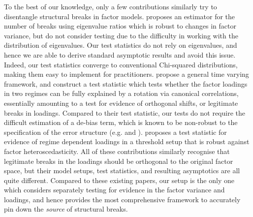 \documentclass[12pt]{article}
\theoremstyle{plain}
\numberwithin{equation}{section}
\begin{document}
To the best of our knowledge, only a few contributions similarly try to disentangle structural breaks in factor models.  \textcite{wang_identification_2021} proposes an estimator for the number of breaks using eigenvalue ratios which is robust to changes in factor variance, but do not consider testing due to the difficulty in working with the distribution of eigenvalues. Our test statistics do not rely on eigenvalues, and hence we are able to derive standard asymptotic results and avoid this issue. Indeed, our test statistics converge to conventional Chi-squared distributions, making them easy to implement for practitioners. \textcite{pelger_state-varying_2022} propose a general time varying framework, and construct a test statistic which tests whether the factor loadings in two regimes can be fully explained by a rotation via canonical correlations, essentially amounting to a test for evidence of orthogonal shifts, or legitimate breaks in loadings. Compared to their test statistic, our tests do not require the difficult estimation of a de-bias term, which is known to be non-robust to the specification of the error structure (e.g. \textcite{su_time-varying_2017} and \textcite{su_testing_2020}). \textcite{massacci_testing_2021} proposes a test statistic for evidence of regime dependent loadings in a threshold setup that is robust against factor heteroscedasticity. All of these contributions similarly recognise that legitimate breaks in the loadings should be orthogonal to the original factor space, but their model setups, test statistics, and resulting asymptotics are all quite different. Compared to these existing papers, our setup is the only one which considers separately testing for evidence in the factor variance and loadings, and hence provides the most comprehensive framework to accurately pin down the \emph{source} of structural breaks. 
\end{document}
